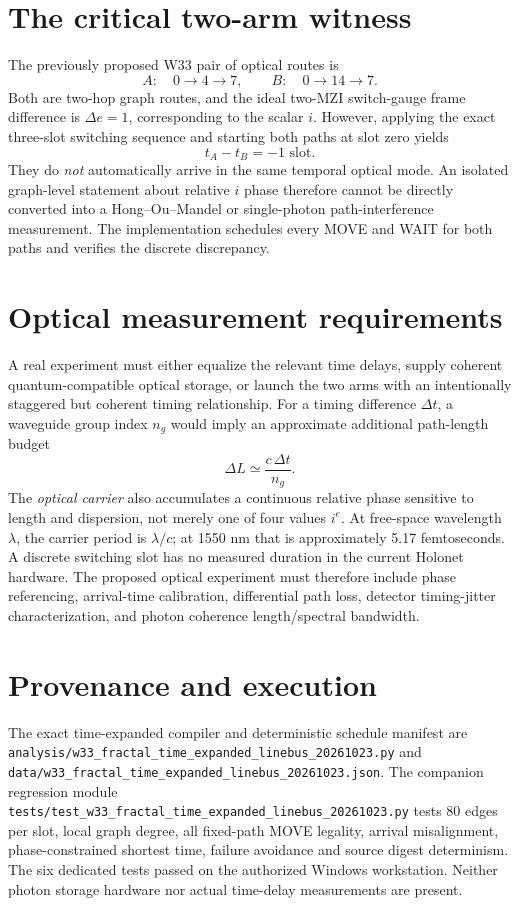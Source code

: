 \documentclass[10pt]{article}
\begin{document}
\section{The critical two-arm witness}
The previously proposed W33 pair of optical routes is
\[
A:\quad 0\to4\to7,\qquad
B:\quad 0\to14\to7.
\]
Both are two-hop graph routes, and the ideal two-MZI
switch-gauge frame difference is $\Delta e=1$,
corresponding to the scalar $i$.
However, applying the exact three-slot switching sequence
and starting both paths at slot zero yields
\[
t_A-t_B=-1\text{ slot}.
\]
They do \emph{not} automatically arrive in the same
temporal optical mode. An isolated graph-level statement
about relative $i$ phase therefore cannot be directly
converted into a Hong--Ou--Mandel or single-photon
path-interference measurement.
The implementation schedules every MOVE and WAIT
for both paths and verifies the discrete discrepancy.
\section{Optical measurement requirements}
A real experiment must either equalize the relevant
time delays, supply coherent quantum-compatible optical
storage, or launch the two arms with an intentionally
staggered but coherent timing relationship.
For a timing difference $\Delta t$, a waveguide group
index $n_g$ would imply an approximate additional
path-length budget
\[
\Delta L\simeq\frac{c\,\Delta t}{n_g}.
\]
The \emph{optical carrier} also accumulates a
continuous relative phase sensitive to length and
dispersion, not merely one of four values $i^e$.
At free-space wavelength $\lambda$, the carrier period
is $\lambda/c$; at 1550 nm that is approximately
5.17 femtoseconds. A discrete switching slot has no
measured duration in the current Holonet hardware.
The proposed optical experiment must therefore include
phase referencing, arrival-time calibration, differential
path loss, detector timing-jitter characterization,
and photon coherence length/spectral bandwidth.
\section{Provenance and execution}
The exact time-expanded compiler and deterministic
schedule manifest are
\texttt{analysis/w33\_fractal\_time\_expanded\_linebus\_20261023.py}
and
\texttt{data/w33\_fractal\_time\_expanded\_linebus\_20261023.json}.
The companion regression module
\texttt{tests/test\_w33\_fractal\_time\_expanded\_linebus\_20261023.py}
tests 80 edges per slot, local graph degree,
all fixed-path MOVE legality, arrival misalignment,
phase-constrained shortest time, failure avoidance
and source digest determinism.
The six dedicated tests passed on the authorized
Windows workstation. Neither photon storage hardware
nor actual time-delay measurements are present.
\end{document}
